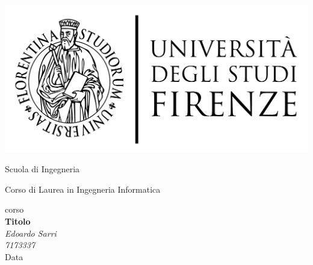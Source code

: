 \newcommand{\scuola}{
	{\fontsize{18pt}{\baselineskip}\selectfont Scuola di Ingegneria}}
\newcommand{\corso}{
    {\fontsize{16pt}{\baselineskip}\selectfont Corso di Laurea in Ingegneria Informatica}}
\newcommand{\lezione}{
	{\fontsize{14pt}{\baselineskip}\selectfont corso}}
 
\begin{titlepage}
    \centering
    \vspace{1cm}
    \includegraphics[scale=0.3]{immagini/logo UniFi.pdf} \\
    \vspace{1cm}
    \scuola \\
    \vspace{0.5cm}
    \corso \\
    \vspace{0.5cm}
    \lezione \\
    \vspace{4cm}
    {\Huge\bfseries Titolo} \\
    \vspace{2cm}
    {\Large\itshape Edoardo Sarri} \\
    \vspace{0.5cm}
    {\Large\itshape 7173337} \\
    \vfill
    {\fontsize{16pt}{\baselineskip}\selectfont Data}
\end{titlepage}